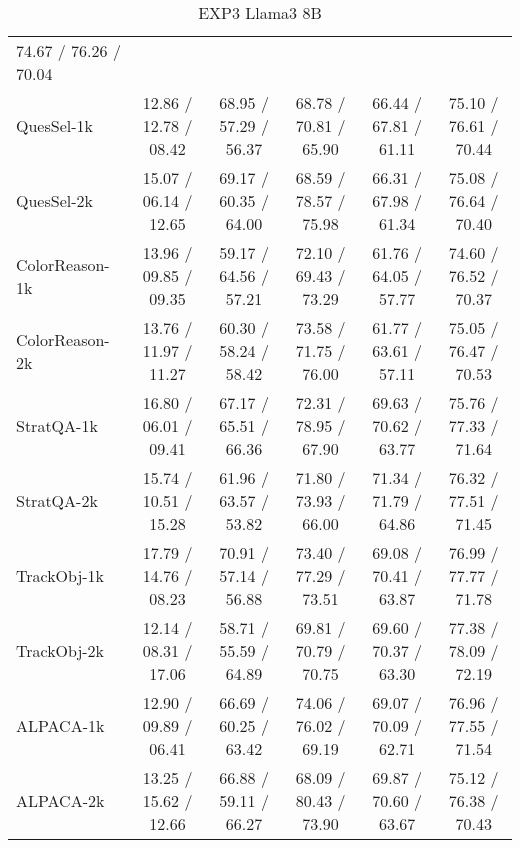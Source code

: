 \begin{table*}[h]
\begin{tabular}{lccccc}
74.67 / 76.26 / 70.04
\\

QuesSel-1k& 
12.86 / 12.78 / 08.42
& 68.95 / 57.29 / 56.37
& 68.78 / 70.81 / 65.90
& 66.44 / 67.81 / 61.11
& 
75.10 / 76.61 / 70.44
\\

QuesSel-2k& 
15.07 / 06.14 / 12.65
& 69.17 / 60.35 / 64.00
& 68.59 / 78.57 / 75.98
& 
66.31 / 67.98 / 61.34
& 



75.08 / 76.64 / 70.40
\\
ColorReason-1k& 13.96 / 09.85 / 09.35
& 59.17 / 64.56 / 57.21
& 72.10 / 69.43 / 73.29
& 61.76 / 64.05 / 57.77
& 74.60 / 76.52 / 70.37
\\

ColorReason-2k& 
13.76 / 11.97 / 11.27
& 60.30 / 58.24 / 58.42
& 73.58 / 71.75 / 76.00
& 
61.77 / 63.61 / 57.11
& 


75.05 / 76.47 / 70.53
\\

StratQA-1k& 
16.80 / 06.01 / 09.41
& 67.17 / 65.51 / 66.36
& 72.31 / 78.95 / 67.90
& 69.63 / 70.62 / 63.77
& 
75.76 / 77.33 / 71.64
\\

StratQA-2k& 
15.74 / 10.51 / 15.28
& 61.96 / 63.57 / 53.82
& 71.80 / 73.93 / 66.00
& 
71.34 / 71.79 / 64.86
& 



76.32 / 77.51 / 71.45
\\
TrackObj-1k& 17.79 / 14.76 / 08.23
& 70.91 / 57.14 / 56.88
& 73.40 / 77.29 / 73.51
& 69.08 / 70.41 / 63.87
& 76.99 / 77.77 / 71.78
\\

TrackObj-2k& 
12.14 / 08.31 / 17.06
& 58.71 / 55.59 / 64.89
& 69.81 / 70.79 / 70.75
& 
69.60 / 70.37 / 63.30
& 


77.38 / 78.09 / 72.19
\\

ALPACA-1k& 
12.90 / 09.89 / 06.41
& 66.69 / 60.25 / 63.42
& 74.06 / 76.02 / 69.19
& 69.07 / 70.09 / 62.71
& 
76.96 / 77.55 / 71.54
\\

ALPACA-2k& 
13.25 / 15.62 / 12.66
& 66.88 / 59.11 / 66.27
& 68.09 / 80.43 / 73.90
& 
69.87 / 70.60 / 63.67
& 



75.12 / 76.38 / 70.43
\\
\bottomrule
\end{tabular}
\caption{EXP3 Llama3 8B}
\label{tab:EXP3 Llama3 8B}
\end{table*}

